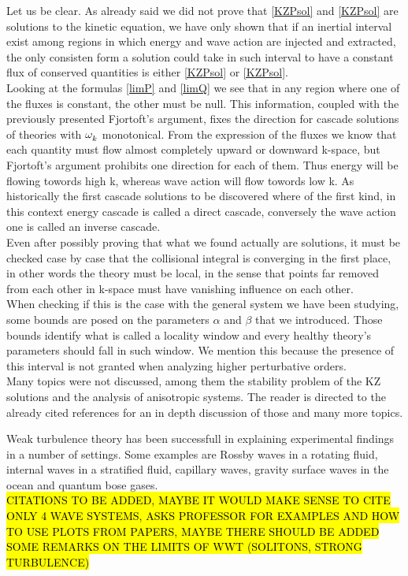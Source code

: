 Let us be clear. As already said we did not prove that \eqref{KZPsol} and \eqref{KZPsol} are solutions to the kinetic equation, we have only shown that if 
an inertial interval exist among regions in which energy and wave action are injected and extracted, the only consisten form a solution could take in such 
interval to have a constant flux of conserved quantities is either \eqref{KZPsol} or \eqref{KZPsol}. \\
Looking at the formulas \eqref{limP} and \eqref{limQ} we see that in any region where one of the fluxes is constant, the other must be null. This information, coupled 
with the previously presented Fjortoft's argument, fixes the direction for cascade solutions of theories with $\omega^{}_k$ monotonical. From the expression of the fluxes 
we know that each quantity must flow almost completely upward or downward k-space, but Fjortoft's argument prohibits one direction for  each of them. Thus energy
will be flowing towords high k, whereas wave action will flow towords low k. As historically the first cascade solutions to be discovered where of the first kind, 
in this context energy cascade is called a direct cascade, conversely the wave action one is called an inverse cascade. \\

Even after possibly proving that what we found actually are solutions, it must be checked case by case that the collisional integral is converging in the first place, 
in other words the theory must be local, in the sense that points far removed from each other in k-space must have vanishing influence on each other. \\
When checking if this is the case with the general system we have been studying, some bounds are posed on the parameters $\alpha$ and $\beta$ that we introduced.
Those bounds identify what is called a locality window and every healthy theory's parameters should fall in such window. We mention this because 
the presence of this interval is not granted when analyzing higher perturbative orders.\\ 
Many topics were not discussed, among them the stability problem of the KZ solutions and the analysis of anisotropic systems. The reader is directed to the 
already cited references for an in depth discussion of those and many more topics.

Weak turbulence theory has been successfull in explaining experimental findings in a number of settings. Some examples are Rossby waves in a rotating fluid, internal waves 
in a stratified fluid, capillary waves, gravity surface waves in the ocean and quantum bose gases. \\
\hl{CITATIONS TO BE ADDED, MAYBE IT WOULD MAKE SENSE TO CITE ONLY 4 WAVE SYSTEMS, ASKS PROFESSOR FOR EXAMPLES AND HOW 
TO USE PLOTS FROM PAPERS, MAYBE THERE SHOULD BE ADDED SOME REMARKS ON THE LIMITS OF WWT (SOLITONS, STRONG TURBULENCE)}
